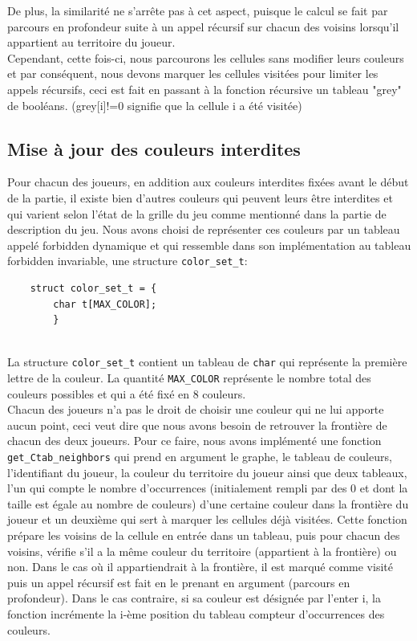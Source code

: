 \documentclass[11pt]{article}
\begin{document}
De plus, la similarité ne s'arrête pas à cet aspect, puisque le calcul se fait par parcours en profondeur suite à un appel récursif sur chacun des voisins lorsqu'il appartient au territoire du joueur. \\Cependant, cette fois-ci, nous parcourons les cellules sans modifier leurs couleurs et par conséquent, nous devons marquer les cellules visitées pour limiter les appels récursifs, ceci est fait en passant à la fonction récursive un tableau "grey" de booléans. (grey[i]!=0 signifie que la cellule i a été visitée)\\

\subsection{Mise à jour des couleurs interdites}
Pour chacun des joueurs, en addition aux couleurs interdites fixées avant le début de la partie, il existe bien d'autres couleurs qui peuvent leurs être interdites et qui varient selon l'état de la grille du jeu comme mentionné dans la partie de description du jeu. Nous avons choisi de représenter ces couleurs par un tableau appelé forbidden dynamique et qui ressemble dans son implémentation au tableau forbidden invariable, une structure \texttt{color\_set\_t}:\\
\begin{lstlisting}
    struct color_set_t = {
        char t[MAX_COLOR];
        }
\end{lstlisting}
\\
La structure \texttt{color\_set\_t} contient un tableau de \texttt{char} qui représente la première lettre de la couleur. La quantité \texttt{MAX\_COLOR} représente le nombre total des couleurs possibles et qui a été fixé en 8 couleurs.\\

Chacun des joueurs n'a pas le droit de choisir une couleur qui ne lui apporte aucun point, ceci veut dire que nous avons besoin de retrouver la frontière de chacun des deux joueurs. Pour ce faire, nous avons implémenté une fonction \texttt{get\_Ctab\_neighbors} qui prend en argument le graphe, le tableau de couleurs, l'identifiant du joueur, la couleur du territoire du joueur ainsi que deux tableaux, l'un qui compte le nombre d'occurrences (initialement rempli par des 0 et dont la taille est égale au nombre de couleurs) d'une certaine couleur dans la frontière du joueur et un deuxième qui sert à marquer les cellules déjà visitées. Cette fonction prépare les voisins de la cellule en entrée dans un tableau, puis pour chacun des voisins, vérifie s'il a la même couleur du territoire (appartient à la frontière) ou non. Dans le cas où il appartiendrait à la frontière, il est marqué comme visité puis un appel récursif est fait en le prenant en argument (parcours en profondeur). Dans le cas contraire, si sa couleur est désignée par l'enter i, la fonction incrémente la i-ème position du tableau compteur d'occurrences des couleurs.\\
\end{document}
